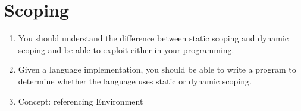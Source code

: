 \section{Scoping}\label{sec:Scoping}

\begin{enumerate}[noitemsep]
\item You should understand the difference between static scoping and dynamic scoping and be able to exploit either in your programming.
\item Given a language implementation, you should be able to write a program to determine whether the language uses static or dynamic scoping.
\item Concept: referencing Environment
\end{enumerate}

